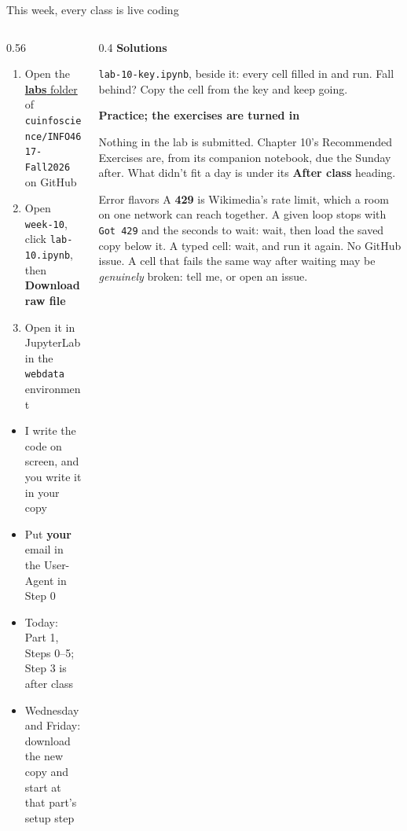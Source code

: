 \documentclass[9pt,aspectratio=169]{beamer}
\begin{document}
\begin{frame}{This week, every class is live coding}
    \begin{columns}[T]
        \begin{column}{0.56\textwidth}
            \begin{enumerate}\small
                \item Open the \href{https://github.com/cuinfoscience/INFO4617-Fall2026/tree/main/labs}{\textbf{labs} folder} of \texttt{cuinfoscience/INFO4617-Fall2026} on GitHub
                \item Open \texttt{week-10}, click \texttt{lab-10.ipynb}, then \textbf{Download raw file}
                \item Open it in JupyterLab in the \texttt{webdata} environment
            \end{enumerate}

            \medskip
            \begin{itemize}\small
                \item I write the code on screen, and you write it in your copy
                \item Put \textbf{your} email in the User-Agent in Step 0
                \item Today: Part 1, Steps 0--5; Step 3 is after class
                \item Wednesday and Friday: download the new copy and start at that part's setup step
            \end{itemize}
        \end{column}
        \begin{column}{0.4\textwidth}
            \textbf{Solutions}\\[2pt]
            {\footnotesize \texttt{lab-10-key.ipynb}, beside it: every cell filled in and run. Fall behind? Copy the cell from the key and keep going.\par}
            \medskip
            \textbf{Practice; the exercises are turned in}\\[2pt]
            {\footnotesize Nothing in the lab is submitted. Chapter 10's Recommended Exercises are, from its companion notebook, due the Sunday after. What didn't fit a day is under its \textbf{After class} heading.\par}
            \medskip
            \begin{alertblock}{Error flavors}
                \footnotesize A \textbf{429} is Wikimedia's rate limit, which a room on one network can reach together. A given loop stops with \texttt{Got 429} and the seconds to wait: wait, then load the saved copy below it. A typed cell: wait, and run it again. No GitHub issue. A cell that fails the same way after waiting may be \textit{genuinely} broken: tell me, or open an issue.
            \end{alertblock}
        \end{column}
    \end{columns}
\end{frame}
\end{document}
